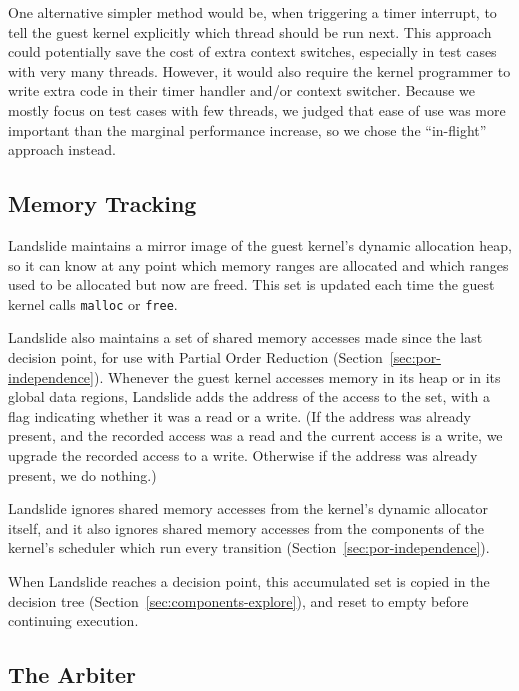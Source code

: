 One alternative simpler method would be, when triggering a timer interrupt, to tell the guest kernel explicitly which thread should be run next. This approach could potentially save the cost of extra context switches, especially in test cases with very many threads. However, it would also require the kernel programmer to write extra code in their timer handler and/or context switcher. Because we mostly focus on test cases with few threads, we judged that ease of use was more important than the marginal performance increase, so we chose the ``in-flight'' approach instead.

\subsection{Memory Tracking}
\label{sec:components-memory}

Landslide maintains a mirror image of the guest kernel's dynamic allocation heap, so it can know at any point which memory ranges are allocated and which ranges used to be allocated but now are freed. This set is updated each time the guest kernel calls \texttt{malloc} or \texttt{free}.

Landslide also maintains a set of shared memory accesses made since the last decision point, for use with Partial Order Reduction (Section~\ref{sec:por-independence}). Whenever the guest kernel accesses memory in its heap or in its global data regions, Landslide adds the address of the access to the set, with a flag indicating whether it was a read or a write. (If the address was already present, and the recorded access was a read and the current access is a write, we upgrade the recorded access to a write. Otherwise if the address was already present, we do nothing.)

Landslide ignores shared memory accesses from the kernel's dynamic allocator itself, and it also ignores shared memory accesses from the components of the kernel's scheduler which run every transition (Section~\ref{sec:por-independence}).

When Landslide reaches a decision point, this accumulated set is copied in the decision tree (Section~\ref{sec:components-explore}), and reset to empty before continuing execution.

\subsection{The Arbiter}
\label{sec:components-arbiter}

